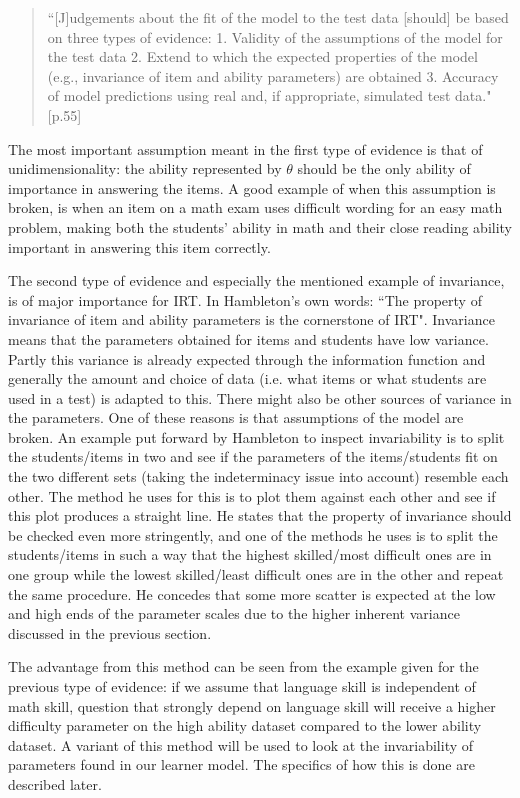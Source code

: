 \documentclass{scrartcl}
\begin{document}
\begin{quote}``[J]udgements about the fit of the model to the test data [should] be based on three types of evidence: 1. Validity of the assumptions of the model for the test data 2. Extend to which the expected properties of the model (e.g., invariance of item and ability parameters) are obtained 3. Accuracy of model predictions using real and, if appropriate, simulated test data."[p.55]
\end{quote}

The most important assumption meant in the first type of evidence is that of unidimensionality: the ability represented by $\theta$ should be the only ability of importance in answering the items. A good example of when this assumption is broken, is when an item on a math exam uses difficult wording for an easy math problem, making both the students' ability in math and their close reading ability important in answering this item correctly.  

The second type of evidence and especially the mentioned example of invariance, is of major importance for IRT. In Hambleton's own words: ``The property of invariance of item and ability parameters is the cornerstone of IRT". Invariance means that the parameters obtained for items and students have low variance. Partly this variance is already expected through the information function and generally the amount and choice of data (i.e. what items or what students are used in a test) is adapted to this. There might also be other sources of variance in the parameters. One of these reasons is that assumptions of the model are broken. An example put forward by Hambleton to inspect invariability is to split the students/items in two and see if the parameters of the items/students fit on the two different sets (taking the indeterminacy issue into account) resemble each other. The method he uses for this is to plot them against each other and see if this plot produces a straight line. He states that the property of invariance should be checked even more stringently, and one of the methods he uses is to split the students/items in such a way that the highest skilled/most difficult ones are in one group while the lowest skilled/least difficult ones are in the other and repeat the same procedure. He concedes that some more scatter is expected at the low and high ends of the parameter scales due to the higher inherent variance discussed in the previous section. 

The advantage from this method can be seen from the example given for the previous type of evidence: if we assume that language skill is independent of math skill, question that strongly depend on language skill will receive a higher difficulty parameter on the high ability dataset compared to the lower ability dataset. A variant of this method will be used to look at the invariability of parameters found in our learner model. The specifics of how this is done are described later. 
\end{document}
